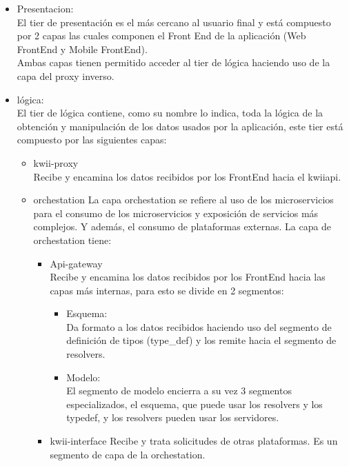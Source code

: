 \begin{itemize}
    \item Presentacion: \\
    El tier de presentación es el más cercano al usuario final y está compuesto por 2 capas las cuales componen el Front End de la aplicación (Web FrontEnd y Mobile FrontEnd). \\
    Ambas capas tienen permitido acceder al tier de lógica haciendo uso de la capa del proxy inverso.
    \item lógica: \\
    El tier  de lógica contiene, como su nombre lo indica, toda la lógica de la obtención y manipulación de los datos usados por la aplicación, este tier está compuesto por las siguientes capas: \\
    \begin{itemize}
        \item kwii-proxy \\
        Recibe y encamina los datos recibidos por los FrontEnd hacia el kwii\textunderscore api. 
        \item orchestation
        La capa orchestation se refiere al uso de los microservicios para el consumo de los microservicios y exposición de servicios más complejos. Y además, el consumo de plataformas externas.
        La capa de orchestation tiene:
        \begin{itemize}
            \item Api-gateway \\
            Recibe y encamina los datos recibidos por los FrontEnd hacia las capas más internas, para esto se divide en 2 segmentos: 
            \begin{itemize}
                \item Esquema: \\
                Da formato a los datos recibidos haciendo uso del segmento de definición de tipos (type\_def) y los remite hacia el segmento de resolvers. 
                \item Modelo: \\
                El segmento de modelo encierra a su vez 3 segmentos especializados, el esquema, que puede usar los resolvers y los type\textunderscore def, y los resolvers pueden usar los servidores.
            \end{itemize}
            \item kwii-interface
            Recibe y trata solicitudes de otras plataformas. Es un segmento de capa de la orchestation.
        \end{itemize}

\end{itemize}
\end{itemize}
